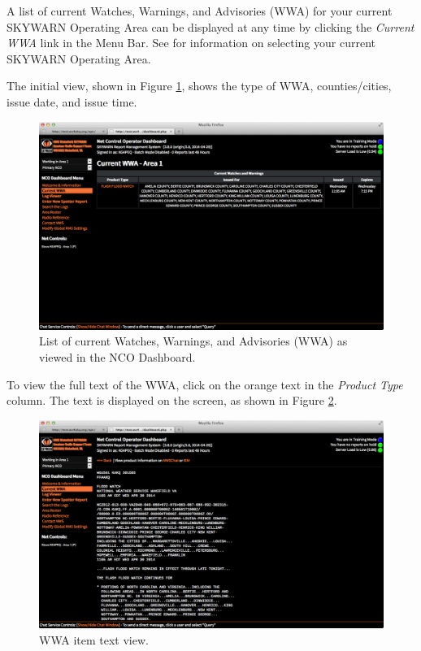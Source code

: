 \documentclass[pdflatex,letterpaper,twoside,12pt]{book}
\begin{document}
A list of current Watches, Warnings, and Advisories (WWA) for your current SKYWARN Operating Area can be displayed at any time by clicking the \emph{Current WWA} link in the Menu Bar.  See  for information on selecting your current SKYWARN Operating Area.

The initial view, shown in Figure \ref{fig:dash-wwa-list}, shows the type of WWA, counties/cities, issue date, and issue time.

\begin{figure}[t]
  \centering
  \includegraphics[width=\textwidth,keepaspectratio=true]{img/dash-wwa-list}
  \caption{List of current Watches, Warnings, and Advisories (WWA) as viewed in the NCO Dashboard.\label{fig:dash-wwa-list}}
\end{figure}

To view the full text of the WWA, click on the orange text in the \emph{Product Type} column.  The text is displayed on the screen, as shown in Figure \ref{fig:dash-wwa-item}.

\begin{figure}[t]
  \centering
  \includegraphics[width=\textwidth,keepaspectratio=true]{img/dash-wwa-item}
  \caption{WWA item text view.\label{fig:dash-wwa-item}}
\end{figure}
\end{document}
